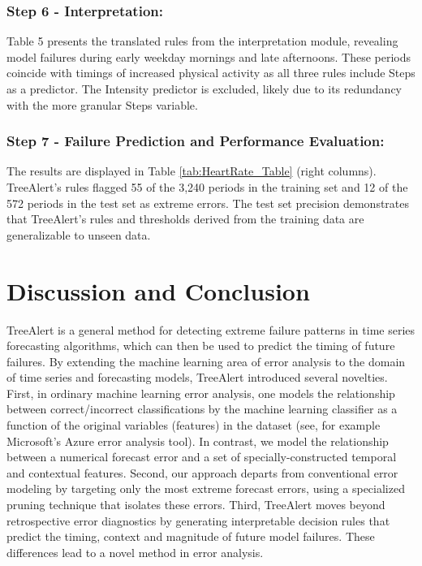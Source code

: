 \documentclass[ijds,sglanonrev]{informs4}
\begin{document}
\subsubsection*{Step 6 - Interpretation:}
Table 5 presents the translated rules from the interpretation module, revealing model failures during early weekday mornings and late afternoons. These  periods coincide with timings of increased physical activity as all three rules include Steps as a predictor. The Intensity predictor is excluded, likely due to its redundancy with the more granular Steps variable.

\subsubsection*{Step 7 - Failure Prediction and Performance Evaluation:}
The results are displayed in Table \ref{tab:HeartRate_Table} (right columns). TreeAlert’s rules flagged 55 of the 3,240 periods in the training set and 12 of the 572 periods in the test set as extreme errors. The test set precision demonstrates that TreeAlert’s rules and thresholds derived from the training data are generalizable to unseen data.

\section{Discussion and Conclusion}

TreeAlert is a general method for detecting extreme failure patterns in time series forecasting algorithms, which can then be used to predict the timing of future failures. By extending the machine learning area of error analysis to the domain of time series and forecasting models, TreeAlert introduced several novelties. First, in ordinary machine learning error analysis, one models the relationship between correct/incorrect classifications by the machine learning classifier as a function of the original variables (features) in the dataset (see, for example Microsoft’s Azure error analysis tool). In contrast, we model the relationship between a numerical forecast error and a set of specially-constructed temporal and contextual features. Second, our approach departs from conventional error modeling by targeting only the most extreme forecast errors, using a specialized pruning technique that isolates these errors. Third, TreeAlert moves beyond retrospective error diagnostics by generating interpretable decision rules that predict the timing, context and magnitude of future model failures. These differences lead to a novel method in error analysis. 
\end{document}
